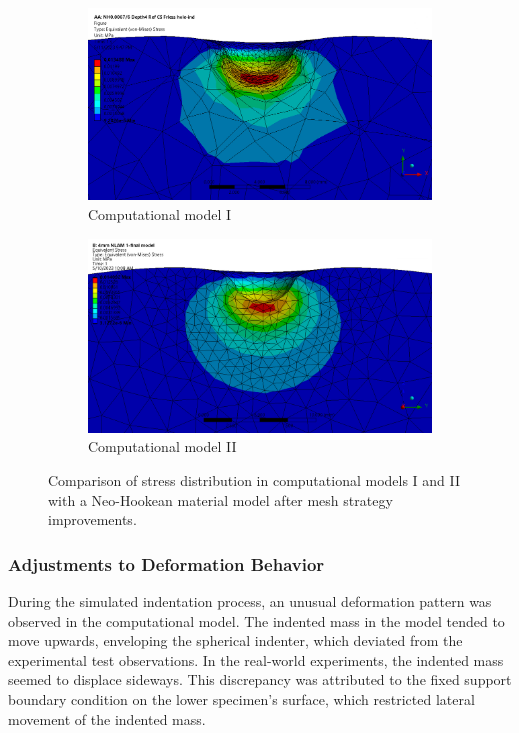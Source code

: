 \begin{figure}
    \centering
    \begin{subfigure}[b]{0.8\textwidth}
    \centering
    \includegraphics[width=\textwidth]{Images/computational/37CSNHstresshalfzoommesh.png}
    \caption{Computational model I}
    \label{fig:cm1stress}
    \end{subfigure}
    \hspace{0.3cm}
    \begin{subfigure}[b]{0.8\textwidth}
    \centering
    \includegraphics[width=\textwidth]{Images/computational/stresscmII.png}
    \caption{Computational model II}
    \label{fig:cm2stress}
    \end{subfigure}
    \hspace{0.3cm}
    \caption[Stress distribution analysis]{Comparison of stress distribution in computational models I and II with a Neo-Hookean material model after mesh strategy improvements.}
    \label{fig:cmIIstressdistanalysis}
\end{figure}

\subsubsection*{Adjustments to Deformation Behavior}
During the simulated indentation process, an unusual deformation pattern was observed in the computational model.
The indented mass in the model tended to move upwards, enveloping the spherical indenter, which deviated from the 
experimental test observations. In the real-world experiments, the indented mass seemed to 
displace sideways. This discrepancy was attributed to the fixed support boundary condition on the lower specimen's 
surface, which restricted lateral movement of the indented mass.

